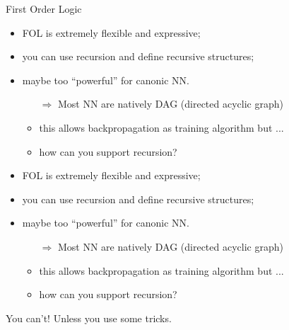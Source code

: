 \documentclass[presentation]{beamer}\mode<presentation>{\usetheme{AMSBolognaFC}}
\begin{document}
\begin{frame}[allowframebreaks]{First Order Logic}
    \begin{itemize}
        \item FOL is extremely flexible and expressive;
        \item you can use recursion and define recursive structures;
        \item maybe too ``powerful'' for canonic NN.
        \begin{itemize}
            \item[$\Rightarrow$] Most NN are natively DAG (directed acyclic graph)
            \item this allows backpropagation as training algorithm but ...
            \item how can you support recursion?  
        \end{itemize}
    \end{itemize}
    \centering
    \phantom{You can't!}
    \phantom{Unless you use some tricks.}
    
    \framebreak
    
    \begin{itemize}
        \item FOL is extremely flexible and expressive;
        \item you can use recursion and define recursive structures;
        \item maybe too ``powerful'' for canonic NN.
        \begin{itemize}
            \item[$\Rightarrow$] Most NN are natively DAG (directed acyclic graph)
            \item this allows backpropagation as training algorithm but ...
            \item how can you support recursion?  
        \end{itemize}
    \end{itemize}
    \centering
    You can't!
    Unless you use some tricks.
    
    \framebreak
    

\end{frame}
\end{document}
